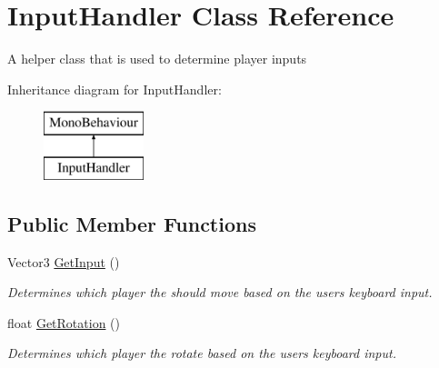 \hypertarget{class_input_handler}{}\section{Input\+Handler Class Reference}
\label{class_input_handler}


A helper class that is used to determine player inputs  


Inheritance diagram for Input\+Handler\+:\begin{figure}[H]
\begin{center}
\leavevmode
\includegraphics[height=2.000000cm]{class_input_handler}
\end{center}
\end{figure}
\subsection*{Public Member Functions}
\begin{DoxyCompactItemize}
\item 
Vector3 \mbox{\hyperlink{class_input_handler_af2d1a0f6af55ed606aca98bbe8416a50}{Get\+Input}} ()
\begin{DoxyCompactList}\small\item\em Determines which player the should move based on the user\textquotesingle{}s keyboard input. \end{DoxyCompactList}\item 
float \mbox{\hyperlink{class_input_handler_a92d09579129aab7376cb6a650997cdbb}{Get\+Rotation}} ()
\begin{DoxyCompactList}\small\item\em Determines which player the rotate based on the user\textquotesingle{}s keyboard input. \end{DoxyCompactList}\end{DoxyCompactItemize}
